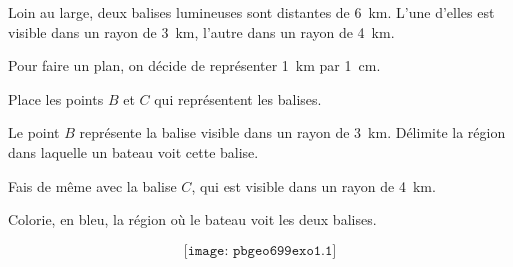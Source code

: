 Loin au large, deux balises lumineuses sont distantes de
6~km. L'une d'elles est visible dans un rayon de 3~km, l'autre
dans un rayon de 4~km.
\par Pour faire un plan, on décide de représenter 1~km par 1~cm.
\begin{myenumerate}
\item Place les points $B$ et $C$ qui représentent les balises.
\item Le point $B$ représente la balise visible dans un rayon de
3~km. Délimite la région dans laquelle un bateau voit cette
balise.
\par Fais de même avec la balise $C$, qui est visible dans un rayon de
4~km.
\item Colorie, en bleu, la région où le bateau voit les deux balises.
\end{myenumerate}
\[\texttt{[image: pbgeo699exo1.1]}\]
